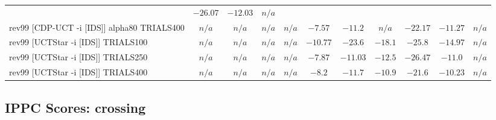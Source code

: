 \documentclass{article}
\begin{document}
\begin{tabular}{|l|r@{$\pm$}rr@{$\pm$}rr@{$\pm$}rr@{$\pm$}rr@{$\pm$}rr@{$\pm$}rr@{$\pm$}rr@{$\pm$}rr@{$\pm$}rr@{$\pm$}r|}
& \multicolumn{2}{c}{$-26.07$}
& \multicolumn{2}{c}{$-12.03$}
& \multicolumn{2}{c|}{\textbf{$n/a$}}
\\
rev99 [CDP-UCT -i [IDS]] alpha80 TRIALS400
& \multicolumn{2}{c}{\textbf{$n/a$}}
& \multicolumn{2}{c}{\textbf{$n/a$}}
& \multicolumn{2}{c}{\textbf{$n/a$}}
& \multicolumn{2}{c}{\textbf{$n/a$}}
& \multicolumn{2}{c}{\textbf{$-7.57$}}
& \multicolumn{2}{c}{$-11.2$}
& \multicolumn{2}{c}{\textbf{$n/a$}}
& \multicolumn{2}{c}{$-22.17$}
& \multicolumn{2}{c}{$-11.27$}
& \multicolumn{2}{c|}{\textbf{$n/a$}}
\\
rev99 [UCTStar -i [IDS]] TRIALS100
& \multicolumn{2}{c}{\textbf{$n/a$}}
& \multicolumn{2}{c}{\textbf{$n/a$}}
& \multicolumn{2}{c}{\textbf{$n/a$}}
& \multicolumn{2}{c}{\textbf{$n/a$}}
& \multicolumn{2}{c}{$-10.77$}
& \multicolumn{2}{c}{$-23.6$}
& \multicolumn{2}{c}{$-18.1$}
& \multicolumn{2}{c}{$-25.8$}
& \multicolumn{2}{c}{$-14.97$}
& \multicolumn{2}{c|}{\textbf{$n/a$}}
\\
rev99 [UCTStar -i [IDS]] TRIALS250
& \multicolumn{2}{c}{\textbf{$n/a$}}
& \multicolumn{2}{c}{\textbf{$n/a$}}
& \multicolumn{2}{c}{\textbf{$n/a$}}
& \multicolumn{2}{c}{\textbf{$n/a$}}
& \multicolumn{2}{c}{\textbf{$-7.87$}}
& \multicolumn{2}{c}{\textbf{$-11.03$}}
& \multicolumn{2}{c}{$-12.5$}
& \multicolumn{2}{c}{$-26.47$}
& \multicolumn{2}{c}{$-11.0$}
& \multicolumn{2}{c|}{\textbf{$n/a$}}
\\
rev99 [UCTStar -i [IDS]] TRIALS400
& \multicolumn{2}{c}{\textbf{$n/a$}}
& \multicolumn{2}{c}{\textbf{$n/a$}}
& \multicolumn{2}{c}{\textbf{$n/a$}}
& \multicolumn{2}{c}{\textbf{$n/a$}}
& \multicolumn{2}{c}{\textbf{$-8.2$}}
& \multicolumn{2}{c}{$-11.7$}
& \multicolumn{2}{c}{$-10.9$}
& \multicolumn{2}{c}{$-21.6$}
& \multicolumn{2}{c}{\textbf{$-10.23$}}
& \multicolumn{2}{c|}{\textbf{$n/a$}}
\\
\hline
\end{tabular}%

\bigskip

\subsection*{IPPC Scores: crossing}
\end{document}
